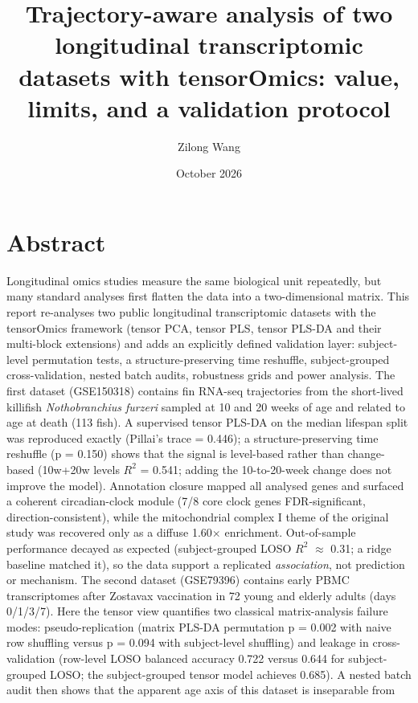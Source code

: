 \documentclass[
]{article}
\title{Trajectory-aware analysis of two longitudinal transcriptomic
datasets with tensorOmics: value, limits, and a validation protocol}
\author{Zilong Wang}
\date{October 2026}
\begin{document}
\maketitle

{
\setcounter{tocdepth}{2}
\tableofcontents
}
\section{Abstract}\label{abstract}

Longitudinal omics studies measure the same biological unit repeatedly,
but many standard analyses first flatten the data into a two-dimensional
matrix. This report re-analyses two public longitudinal transcriptomic
datasets with the tensorOmics framework (tensor PCA, tensor PLS, tensor
PLS-DA and their multi-block extensions) and adds an explicitly defined
validation layer: subject-level permutation tests, a
structure-preserving time reshuffle, subject-grouped cross-validation,
nested batch audits, robustness grids and power analysis. The first
dataset (GSE150318) contains fin RNA-seq trajectories from the
short-lived killifish \emph{Nothobranchius furzeri} sampled at 10 and 20
weeks of age and related to age at death (113 fish). A supervised tensor
PLS-DA on the median lifespan split was reproduced exactly (Pillai's
trace = 0.446); a structure-preserving time reshuffle (p = 0.150) shows
that the signal is level-based rather than change-based (10w+20w levels
\(R^2\) = 0.541; adding the 10-to-20-week change does not improve the
model). Annotation closure mapped all analysed genes and surfaced a
coherent circadian-clock module (7/8 core clock genes FDR-significant,
direction-consistent), while the mitochondrial complex I theme of the
original study was recovered only as a diffuse 1.60\(\times\)
enrichment. Out-of-sample performance decayed as expected
(subject-grouped LOSO \(R^2\) \(\approx\) 0.31; a ridge baseline matched
it), so the data support a replicated \emph{association}, not prediction
or mechanism. The second dataset (GSE79396) contains early PBMC
transcriptomes after Zostavax vaccination in 72 young and elderly adults
(days 0/1/3/7). Here the tensor view quantifies two classical
matrix-analysis failure modes: pseudo-replication (matrix PLS-DA
permutation p = 0.002 with naive row shuffling versus p = 0.094 with
subject-level shuffling) and leakage in cross-validation (row-level LOSO
balanced accuracy 0.722 versus 0.644 for subject-grouped LOSO; the
subject-grouped tensor model achieves 0.685). A nested batch audit then
shows that the apparent age axis of this dataset is inseparable from
\end{document}
